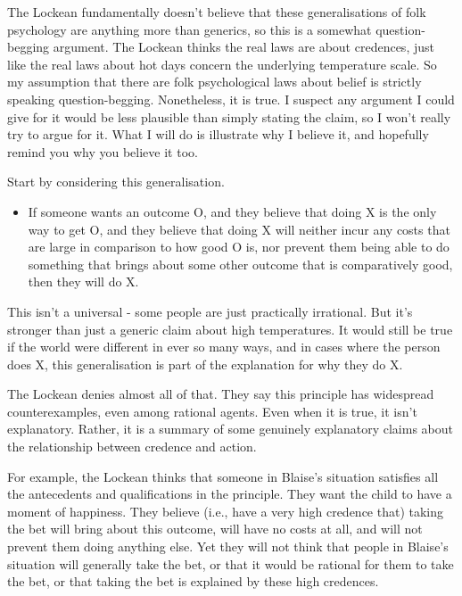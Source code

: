 \documentclass[
  10pt,
  letterpaper,
  twoside]{scrbook}
\providecommand{\tightlist}{%
  \setlength{\itemsep}{0pt}\setlength{\parskip}{0pt}}\usepackage{longtable,booktabs,array}
\begin{document}
The Lockean fundamentally doesn't believe that these generalisations of
folk psychology are anything more than generics, so this is a somewhat
question-begging argument. The Lockean thinks the real laws are about
credences, just like the real laws about hot days concern the underlying
temperature scale. So my assumption that there are folk psychological
laws about belief is strictly speaking question-begging. Nonetheless, it
is true. I suspect any argument I could give for it would be less
plausible than simply stating the claim, so I won't really try to argue
for it. What I will do is illustrate why I believe it, and hopefully
remind you why you believe it too.

Start by considering this generalisation.

\begin{itemize}
\tightlist
\item
  If someone wants an outcome O, and they believe that doing X is the
  only way to get O, and they believe that doing X will neither incur
  any costs that are large in comparison to how good O is, nor prevent
  them being able to do something that brings about some other outcome
  that is comparatively good, then they will do X.
\end{itemize}

This isn't a universal - some people are just practically irrational.
But it's stronger than just a generic claim about high temperatures. It
would still be true if the world were different in ever so many ways,
and in cases where the person does X, this generalisation is part of the
explanation for why they do X.

The Lockean denies almost all of that. They say this principle has
widespread counterexamples, even among rational agents. Even when it is
true, it isn't explanatory. Rather, it is a summary of some genuinely
explanatory claims about the relationship between credence and action.

For example, the Lockean thinks that someone in Blaise's situation
satisfies all the antecedents and qualifications in the principle. They
want the child to have a moment of happiness. They believe (i.e., have a
very high credence that) taking the bet will bring about this outcome,
will have no costs at all, and will not prevent them doing anything
else. Yet they will not think that people in Blaise's situation will
generally take the bet, or that it would be rational for them to take
the bet, or that taking the bet is explained by these high credences.
\end{document}
